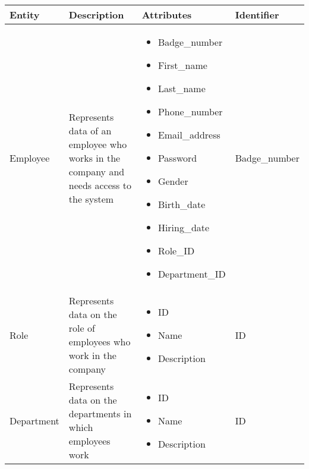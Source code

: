 \begin{longtable}{|p{}|p{} |p{}|p{} |}
    \hline
    \textbf{Entity} & \textbf{Description} & \textbf{Attributes} & \textbf{Identifier}  \\\hline

    Employee & Represents data of an employee who works in the company and needs access to the system &
    \begin{itemize}
        \vspace{-1em}
        \item Badge\_number
        \item First\_name
        \item Last\_name
        \item Phone\_number
        \item Email\_address
        \item Password      %
        \item Gender
        \item Birth\_date
        \item Hiring\_date
        \item Role\_ID
        \item Department\_ID
    \end{itemize}
    &  Badge\_number \\\hline

    Role & Represents data on the role of employees who work in the company &
    \begin{itemize}
        \vspace{-1em}
        \item ID
        \item Name
        \item Description
    \end{itemize}
    &  ID \\\hline

    Department & Represents data on the departments in which employees work &
    \begin{itemize}
        \vspace{-1em}
        \item ID
        \item Name
        \item Description
    \end{itemize}
    &  ID \\\hline


\end{longtable}
